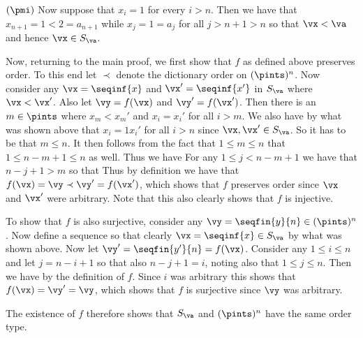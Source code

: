 {{    $(\pmi)$ Now suppose that $x_i = 1$ for every $i > n$.
    Then we have that $x_{n+1} = 1 < 2 = a_{n+1}$ while $x_j = 1 = a_j$ for all $j > n+1 > n$ so that $\vx < \va$ and hence $\vx \in S_\va$.

    Now, returning to the main proof, we first show that $f$ as defined above preserves order.
    To this end let $\prec$ denote the dictionary order on $(\pints)^n$.
    Now consider any $\vx = \seqinf{x}$ and $\vx' = \seqinf{x'}$ in $S_\va$ where $\vx < \vx'$.
    Also let $\vy = f(\vx)$ and $\vy' = f(\vx')$.
    Then there is an $m \in \pints$ where $x_m < x_m'$ and $x_i = x_i'$ for all $i > m$.
    We also have by what was shown above that $x_i = 1 x_i'$ for all $i > n$ since $\vx,\vx' \in S_\va$.
    So it has to be that $m \leq n$.
    It then follows from the fact that $1 \leq m \leq n$ that $1 \leq n-m+1 \leq n$ as well.
    Thus we have
    For any $1 \leq j < n-m+1$ we have that $n-j+1 > m$ so that
    Thus by definition we have that $f(\vx) = \vy \prec \vy' = f(\vx')$, which shows that $f$ preserves order since $\vx$ and $\vx'$ were arbitrary.
    Note that this also clearly shows that $f$ is injective.

    To show that $f$ is also surjective, consider any $\vy = \seqfin{y}{n} \in (\pints)^n$.
    Now define a sequence
    so that clearly $\vx = \seqinf{x} \in S_\va$ by what was shown above.
    Now let $\vy' = \seqfin{y'}{n} = f(\vx)$.
    Consider any $1 \leq i \leq n$ and let $j = n-i+1$ so that also $n-j+1 = i$, noting also that $1 \leq j \leq n$.
    Then we have
    by the definition of $f$.
    Since $i$ was arbitrary this shows that $f(\vx) = \vy' = \vy$, which shows that $f$ is surjective since $\vy$ was arbitrary.

    The existence of $f$ therefore shows that $S_\va$ and $(\pints)^n$ have the same order type.
  }

}
